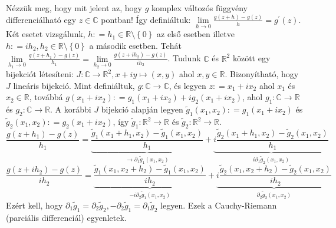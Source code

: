 \documentclass[12pt,a4paper]{scrartcl}
\begin{document}
Nézzük meg, hogy mit jelent az, hogy \(g\) komplex változós függvény
differenciálható egy \(z \in {\mathbb{C}}\) pontban! Így definiáltuk:
\(\lim\limits_{h\rightarrow 0}\frac{g\left( {z + h} \right) - g\left( z \right)}{h} = g^{\prime}\left( z \right)\).
Két esetet vizsgálunk,
\(h: = h_{1} \in {\mathbb{R}}\text{\textbackslash}\left\{ 0 \right\}\)
az első esetben illetve
\(h: = ih_{2},h_{2} \in {\mathbb{R}}\text{\textbackslash}\left\{ 0 \right\}\)
a második esetben. Tehát
\(\lim\limits_{h_{1}\rightarrow 0}\frac{g\left( {z + h_{1}} \right) - g\left( z \right)}{h_{1}} = \lim\limits_{h_{2}\rightarrow 0}\frac{g\left( {z + ih_{2}} \right) - g\left( z \right)}{ih_{2}}\).
Tudunk \(\mathbb{C}\) és \({\mathbb{R}}^{2}\) között egy bijekciót
létesíteni:
\(\left. J:{\mathbb{C}}\rightarrow{\mathbb{R}}^{2},x + iy\mapsto\left( {x,y} \right) \right.\)
ahol \(x,y \in {\mathbb{R}}\). Bizonyítható, hogy \(J\) lineáris
bijekció. Mint definiáltuk,
\(\left. g:{\mathbb{C}}\rightarrow{\mathbb{C}} \right.\), és legyen
\(z: = x_{1} + ix_{2}\) ahol \(x_{1}\) és \(x_{2} \in {\mathbb{R}}\),
továbbá
\(g\left( {x_{1} + ix_{2}} \right): = g_{1}\left( {x_{1} + ix_{2}} \right) + ig_{2}\left( {x_{1} + ix_{2}} \right)\),
ahol \(\left. g_{1}:{\mathbb{C}}\rightarrow{\mathbb{R}} \right.\) és
\(\left. g_{2}:{\mathbb{C}}\rightarrow{\mathbb{R}} \right.\). A korábbi
\(J\) bijekció alapján legyen
\({\widetilde{g}}_{1}\left( {x_{1},x_{2}} \right): = g_{1}\left( {x_{1} + ix_{2}} \right)\)
és
\({\widetilde{g}}_{2}\left( {x_{1},x_{2}} \right): = g_{2}\left( {x_{1} + ix_{2}} \right)\),
így
\(\left. {\widetilde{g}}_{1}:{\mathbb{R}}^{2}\rightarrow{\mathbb{R}} \right.\)
és
\(\left. {\widetilde{g}}_{2}:{\mathbb{R}}^{2}\rightarrow{\mathbb{R}} \right.\).
\[\frac{{g(z + {h_1}) - g(z)}}{{{h_1}}} = \underbrace {\frac{{{{\tilde g}_1}({x_1} + {h_1},{x_2}) - {{\tilde g}_1}({x_1},{x_2})}}{{{h_1}}}}_{ \to {\partial _1}{{\tilde g}_1}({x_1},{x_2})} + \underbrace {i\frac{{{{\tilde g}_2}({x_1} + {h_1},{x_2}) - {{\tilde g}_2}({x_1},{x_2})}}{{{h_1}}}}_{i{\partial _1}{{\tilde g}_2}({x_1},{x_2})}\]
\[\frac{{g(z + i{h_2}) - g(z)}}{{i{h_2}}} = \underbrace {\frac{{{{\tilde g}_1}({x_1},{x_2} + {h_2}) - {{\tilde g}_1}({x_1},{x_2})}}{{i{h_2}}}}_{ - i{\partial _2}{{\tilde g}_1}({x_1},{x_2})} + \underbrace {i\frac{{{{\tilde g}_2}({x_1},{x_2} + {h_2}) - {{\tilde g}_2}({x_1},{x_2})}}{{i{h_2}}}}_{{\partial _2}{{\tilde g}_2}({x_1},{x_2})}\]
Ezért kell, hogy
\(\partial_{1}{\widetilde{g}}_{1} = \partial_{2}{\widetilde{g}}_{2}, - \partial_{2}{\widetilde{g}}_{1} = \partial_{1}{\widetilde{g}}_{2}\)
legyen. Ezek a Cauchy-Riemann (parciális differenciál) egyenletek.
\end{document}
